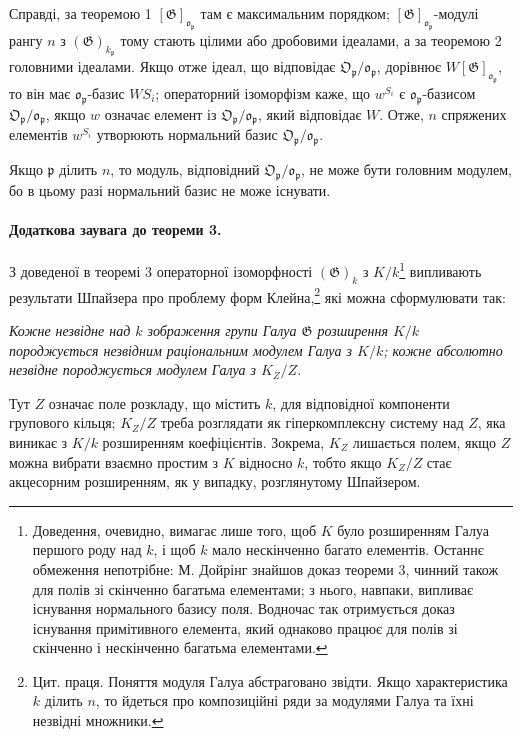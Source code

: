 \documentclass[11pt]{article}
\providecommand{\frakO}{\mathfrak{O}}
\providecommand{\frako}{\mathfrak{o}}
\providecommand{\frakp}{\mathfrak{p}}
\providecommand{\Gg}{\mathfrak{G}}
\begin{document}
Справді, за теоремою 1 \([\Gg]_{\frako_\frakp}\) там є максимальним порядком; \([\Gg]_{\frako_\frakp}\)-модулі рангу \(n\) з \((\Gg)_{k_\frakp}\) тому стають цілими або дробовими ідеалами, а за теоремою 2 головними ідеалами. Якщо отже ідеал, що відповідає \(\frakO_\frakp/\frako_\frakp\), дорівнює \(W[\Gg]_{\frako_\frakp}\), то він має \(\frako_\frakp\)-базис \(WS_i\); операторний ізоморфізм каже, що \(w^{S_i}\) є \(\frako_\frakp\)-базисом \(\frakO_\frakp/\frako_\frakp\), якщо \(w\) означає елемент із \(\frakO_\frakp/\frako_\frakp\), який відповідає \(W\). Отже, \(n\) спряжених елементів \(w^{S_i}\) утворюють нормальний базис \(\frakO_\frakp/\frako_\frakp\).

Якщо \(\frakp\) ділить \(n\), то модуль, відповідний \(\frakO_\frakp/\frako_\frakp\), не може бути головним модулем, бо в цьому разі нормальний базис не може існувати.

\paragraph{Додаткова заувага до теореми 3.}
З доведеної в теоремі 3 операторної ізоморфності \((\Gg)_k\) з \(K/k\)\footnote{Доведення, очевидно, вимагає лише того, щоб \(K\) було розширенням Галуа першого роду над \(k\), і щоб \(k\) мало нескінченно багато елементів. Останнє обмеження непотрібне: М. Дойрінг знайшов доказ теореми 3, чинний також для полів зі скінченно багатьма елементами; з нього, навпаки, випливає існування нормального базису поля. Водночас так отримується доказ існування примітивного елемента, який однаково працює для полів зі скінченно і нескінченно багатьма елементами.} випливають результати Шпайзера про проблему форм Клейна,\footnote{Цит. праця. Поняття модуля Галуа абстраговано звідти. Якщо характеристика \(k\) ділить \(n\), то йдеться про композиційні ряди за модулями Галуа та їхні незвідні множники.} які можна сформулювати так:

\emph{Кожне незвідне над \(k\) зображення групи Галуа \(\Gg\) розширення \(K/k\) породжується незвідним раціональним модулем Галуа з \(K/k\); кожне абсолютно незвідне породжується модулем Галуа з \(K_Z/Z\).}

Тут \(Z\) означає поле розкладу, що містить \(k\), для відповідної компоненти групового кільця; \(K_Z/Z\) треба розглядати як гіперкомплексну систему над \(Z\), яка виникає з \(K/k\) розширенням коефіцієнтів. Зокрема, \(K_Z\) лишається полем, якщо \(Z\) можна вибрати взаємно простим з \(K\) відносно \(k\), тобто якщо \(K_Z/Z\) стає акцесорним розширенням, як у випадку, розглянутому Шпайзером.
\end{document}

